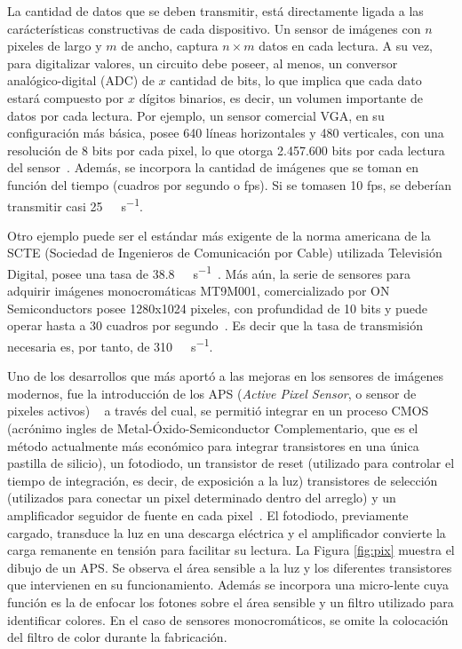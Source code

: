 La cantidad de datos que se deben transmitir, está directamente ligada a las carácterísticas constructivas de cada dispositivo. Un sensor de imágenes con $n$ pixeles de largo y $m$ de ancho, captura $n\times m$ datos en cada lectura. A su vez, para digitalizar valores, un circuito debe poseer, al menos, un conversor analógico-digital (ADC) de $x$ cantidad de bits, lo que implica que cada dato estará compuesto por $x$ dígitos binarios, es decir, un volumen importante de datos por cada lectura. Por ejemplo, un sensor comercial VGA, en su configuración más básica, posee 640 líneas horizontales y 480 verticales, con una resolución de 8 bits por cada pixel, lo que otorga 2.457.600 bits por cada lectura del sensor~\cite{ONSemiconductor2014}. Además, se incorpora la cantidad de imágenes que se toman en función del tiempo (cuadros por segundo o fps). Si se tomasen 10 fps, se deberían transmitir casi \SI{25}{\mega\bit\per\second}.

Otro ejemplo puede ser el estándar más exigente de la norma americana de la SCTE (Sociedad de Ingenieros de Comunicación por Cable) utilizada Televisión Digital, posee una tasa de \SI{38.8}{\mega\bit\per\second}~\cite{SocietyofCableTelecommuniocationsEngineers2006}. Más aún, la serie de sensores para adquirir imágenes monocromáticas MT9M001, comercializado por ON Semiconductors posee 1280x1024 pixeles, con profundidad de 10 bits y puede operar hasta a 30 cuadros por segundo~\cite{MicronTechnology2004}. Es decir que la tasa de transmisión necesaria es, por tanto, de \SI{310}{\mega\bit\per\second}.

Uno de los desarrollos que más aportó a las mejoras en los sensores de imágenes modernos, fue la introducción de los APS ({\it Active Pixel Sensor}, o sensor de pixeles activos) ~\cite{Mendis1994} a través del cual, se permitió integrar en un proceso CMOS (acrónimo ingles de Metal-Óxido-Semiconductor Complementario, que es el método actualmente más económico para integrar transistores en una única pastilla de silicio), un fotodiodo, un transistor de reset (utilizado para controlar el tiempo de integración, es decir, de exposición a la luz) transistores de selección (utilizados para conectar un pixel determinado dentro del arreglo) y un amplificador seguidor de fuente en cada pixel~\cite{Turchetta2019}. El fotodiodo, previamente cargado, transduce la luz en una descarga eléctrica y el amplificador convierte la carga remanente en tensión para facilitar su lectura. La Figura \ref{fig:pix} muestra el dibujo de un APS. Se observa el área sensible a la luz y los diferentes transistores que intervienen en su funcionamiento. Además se incorpora una micro-lente cuya función es la de enfocar los fotones sobre el área sensible y un filtro utilizado para identificar colores. En el caso de sensores monocromáticos, se omite la colocación del filtro de color durante la fabricación.%

